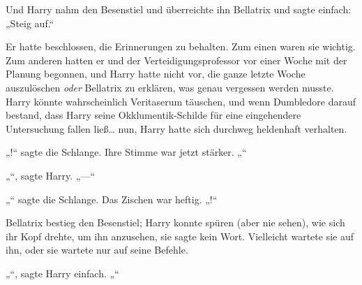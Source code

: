 Und Harry nahm den Besenstiel und überreichte ihn Bellatrix und sagte einfach: „Steig auf.“

Er hatte beschlossen, die Erinnerungen zu behalten. Zum einen waren sie wichtig. Zum anderen hatten er und der Verteidigungsprofessor vor einer Woche mit der Planung begonnen, und Harry hatte nicht vor, die ganze letzte Woche auszulöschen \emph{oder} Bellatrix zu erklären, was genau vergessen werden musste. Harry könnte wahrscheinlich Veritaserum täuschen, und wenn Dumbledore darauf bestand, dass Harry seine Okklumentik-Schilde für eine eingehendere Untersuchung fallen ließ… nun, Harry hatte sich durchweg heldenhaft verhalten.

„!“ sagte die Schlange. Ihre Stimme war jetzt stärker. „“

„“, sagte Harry. „—“

„“ sagte die Schlange. Das Zischen war heftig. „!“

Bellatrix bestieg den Besenstiel; Harry konnte spüren (aber nie sehen), wie sich ihr Kopf drehte, um ihn anzusehen, sie sagte kein Wort. Vielleicht wartete sie auf ihn, oder sie wartete nur auf seine Befehle.

„“, sagte Harry einfach. „“


